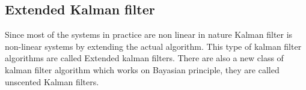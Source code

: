 \subsection{Extended Kalman filter}
Since most of the systems in practice are non linear in nature Kalman filter is  non-linear systems by extending the actual algorithm. This type of kalman filter algorithms are called Extended kalman filters. There are also a new class of kalman filter algorithm which works on Bayasian principle, they are called unscented Kalman filters.
